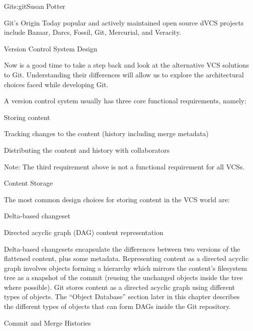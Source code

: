 \begin{aosachapter}{Git}{s:git}{Susan Potter}
\begin{aosasect1}{Git's Origin}
Today popular and actively maintained open source dVCS projects include
Bazaar, Darcs, Fossil, Git, Mercurial, and Veracity.

\end{aosasect1}

\begin{aosasect1}{Version Control System Design}

Now is a good time to take a step back and look at the alternative VCS
solutions to Git. Understanding their differences will allow us to explore
the architectural choices faced while developing Git.

A version control system usually has three core functional
requirements, namely:

\begin{aosaitemize}
  \item Storing content
  \item Tracking changes to the content (history including merge metadata)
  \item Distributing the content and history with collaborators
\end{aosaitemize}

\noindent Note: The third requirement above is not a functional requirement for
all VCSs.

\begin{aosasect2}{Content Storage}

The most common design choices for storing content in the VCS world are:
\begin{aosaitemize}
  \item Delta-based changeset
  \item Directed acyclic graph (DAG) content representation
\end{aosaitemize}

Delta-based changesets encapsulate the differences between two versions of
the flattened content, plus some metadata. Representing content as a
directed acyclic graph involves objects forming a hierarchy
which mirrors the content's filesystem tree as a snapshot of the commit (reusing
the unchanged objects inside the tree where possible). Git stores content as
a directed acyclic graph using different types of objects. The
``Object Database'' section later in this chapter describes the different
types of objects that can form DAGs inside the Git repository.

\end{aosasect2}
\begin{aosasect2}{Commit and Merge Histories}


\end{aosasect2}
\end{aosasect1}
\end{aosachapter}
